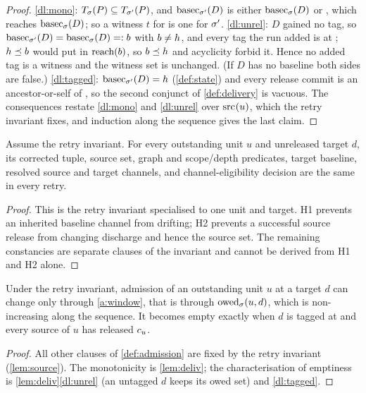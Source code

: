 \begin{proof}
\ref{dl:mono}: $T_{\sigma}(P) \subseteq T_{\sigma'}(P)$, and
$\mathrm{basec}_{\sigma'}(D)$ is either $\mathrm{basec}_{\sigma}(D)$ or \Head{}, which reaches
$\mathrm{basec}_{\sigma}(D)$; so a witness $t$ for \st{} is one for $\sigma'$.
\ref{dl:unrel}: $D$ gained no tag, so $\mathrm{basec}_{\sigma'}(D) = \mathrm{basec}_{\sigma}(D) =: b$
with $b \neq h$, and every tag the run added is at \Head{}; $h \preceq b$
would put \Head{} in $\mathrm{reach}(b)$, so $b \preceq h$ and acyclicity forbid it.
Hence no added tag is a witness and the witness set is unchanged. (If $D$ has
no baseline both sides are false.)
\ref{dl:tagged}: $\mathrm{basec}_{\sigma'}(D) = h$ (\cref{def:state}) and every
release commit is an ancestor-or-self of \Head{}, so the second conjunct of
\cref{def:delivery} is vacuous. The consequences restate \ref{dl:mono} and
\ref{dl:unrel} over $\mathrm{src}_{}(u)$, which the retry invariant fixes, and
induction along the sequence gives the last claim.
\end{proof}

\begin{lemma}
\label{lem:source}
Assume the retry invariant. For every outstanding unit $u$ and unreleased
target $d$, its corrected tuple, source set, graph and scope/depth predicates,
target baseline, resolved source and target channels, and channel-eligibility
decision are the same in every retry.
\end{lemma}

\begin{proof}
This is the retry invariant specialised to one unit and target. H1 prevents an
inherited baseline channel from drifting; H2 prevents a successful source
release from changing discharge and hence the source set. The remaining
constancies are separate clauses of the invariant and cannot be derived from
H1 and H2 alone.
\end{proof}

\begin{lemma}
\label{lem:channel}
Under the retry invariant, admission of an outstanding unit $u$ at a target
$d$ can change only through \cref{a:window}, that is through
$\mathrm{owed}_{\sigma}(u,d)$, which is non-increasing along the sequence. It becomes
empty exactly when $d$ is tagged at \Head{} and every source of $u$ has
released $c_{u}$.
\end{lemma}

\begin{proof}
All other clauses of \cref{def:admission} are fixed by the retry invariant
(\cref{lem:source}). The monotonicity is \cref{lem:deliv}; the
characterisation of emptiness is \cref{lem:deliv}\ref{dl:unrel} (an untagged
$d$ keeps its owed set) and \ref{dl:tagged}.
\end{proof}

